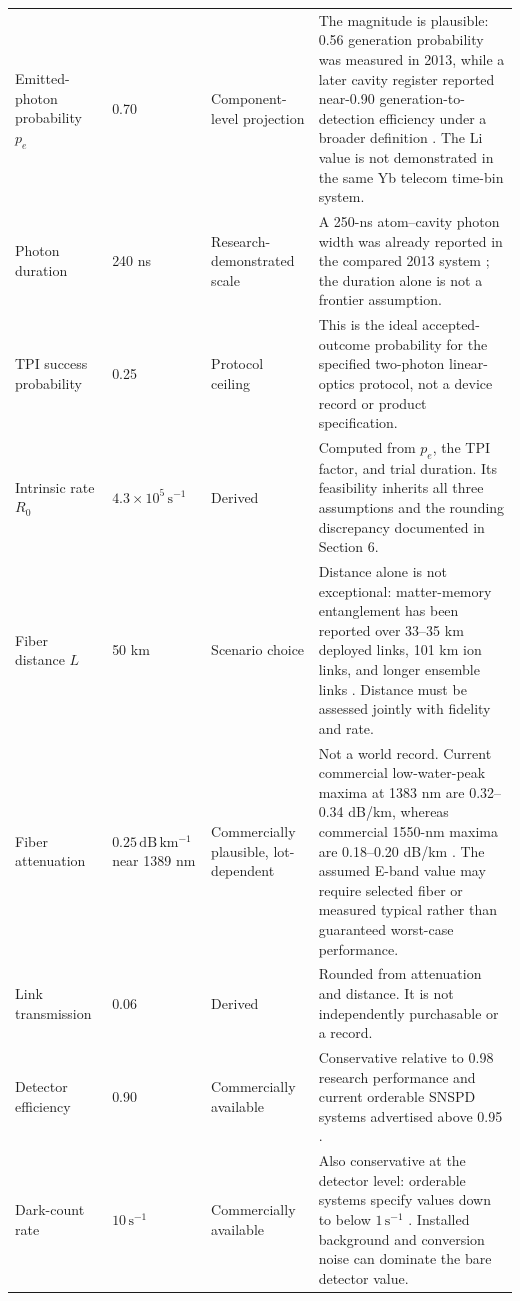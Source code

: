 \documentclass[10pt]{article}
\begin{document}
\begin{longtable}{L{0.19\textwidth}L{0.12\textwidth}L{0.18\textwidth}L{0.39\textwidth}}
  Emitted-photon probability $p_e$ & 0.70 & Component-level projection & The magnitude is plausible: 0.56 generation probability was measured in 2013, while a later cavity register reported near-0.90 generation-to-detection efficiency under a broader definition \cite{muecke2013,hartung2024}.  The Li value is not demonstrated in the same Yb telecom time-bin system. \\
  Photon duration & 240 ns & Research-demonstrated scale & A 250-ns atom--cavity photon width was already reported in the compared 2013 system \cite{muecke2013}; the duration alone is not a frontier assumption. \\
  TPI success probability & 0.25 & Protocol ceiling & This is the ideal accepted-outcome probability for the specified two-photon linear-optics protocol, not a device record or product specification. \\
  Intrinsic rate $R_0$ & $4.3\times10^5\,\mathrm{s}^{-1}$ & Derived & Computed from $p_e$, the TPI factor, and trial duration.  Its feasibility inherits all three assumptions and the rounding discrepancy documented in Section 6. \\
  Fiber distance $L$ & 50 km & Scenario choice & Distance alone is not exceptional: matter-memory entanglement has been reported over 33--35 km deployed links, 101 km ion links, and longer ensemble links \cite{vanleent2022,knaut2024,liu2026,luo2025}.  Distance must be assessed jointly with fidelity and rate. \\
  Fiber attenuation & $0.25\,\mathrm{dB\,km^{-1}}$ near 1389 nm & Commercially plausible, lot-dependent & Not a world record.  Current commercial low-water-peak maxima at 1383 nm are 0.32--0.34 dB/km, whereas commercial 1550-nm maxima are 0.18--0.20 dB/km \cite{corning2025,fujikura2026}.  The assumed E-band value may require selected fiber or measured typical rather than guaranteed worst-case performance. \\
  Link transmission & 0.06 & Derived & Rounded from attenuation and distance.  It is not independently purchasable or a record. \\
  Detector efficiency & 0.90 & Commercially available & Conservative relative to 0.98 research performance and current orderable SNSPD systems advertised above 0.95 \cite{reddy2020,idq2026}. \\
  Dark-count rate & $10\,\mathrm{s}^{-1}$ & Commercially available & Also conservative at the detector level: orderable systems specify values down to below $1\,\mathrm{s}^{-1}$ \cite{idq2026}.  Installed background and conversion noise can dominate the bare detector value. \\

\end{longtable}
\end{document}
